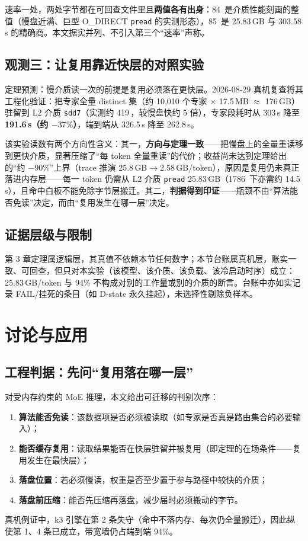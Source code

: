 \documentclass[11pt]{ctexart}
\begin{document}
速率一处，两处字节都在可回查文件里且\textbf{两值各有出身}：84\, 是介质性能刻画的整值（慢盘近满、巨型 O\_DIRECT \texttt{pread} 的实测形态），85\, 是 25.83\,GB 与 303.58\,s 的精确商。本文据实并列、不引入第三个“速率”声称。

\subsection{观测三：让复用靠近快层的对照实验}

定理预测：慢介质读一次的前提是复用必须落在更快层。2026-08-29 真机复查将其工程化验证：把专家全量 distinct 集（约 10,010 个专家 $\times$ 17.5\,MB $\approx$ 176\,GB）驻留到 L2 介质 \texttt{sdd7}（实测约 419\,，较慢盘快约 5 倍），专家段耗时从 303\,s 降至 \textbf{191.6\,s（约 $-37\%$）}，端到端从 326.5\,s 降至 262.8\,s。

该实验读数有两个方向性含义：其一，\textbf{方向与定理一致}——把慢盘上的全量重读移到更快介质，显著压缩了“每 token 全量重读”的代价；收益尚未达到定理给出的“约 $-90\%$”上界（trace 推演 25.8\,GB$\to$2.58\,GB/token），原因是复用仍未真正落进内存层——每一 token 仍需从 L2 介质 \texttt{pread} 25.83\,GB（1786\, 下亦需约 14.5\,s），且命中白板不能免除字节层搬迁。其二，\textbf{判据得到印证}——瓶颈不由“算法能否免读”决定，而由“复用发生在哪一层”决定。

\subsection{证据层级与限制}

第 3 章定理属逻辑层，其真值不依赖本节任何数字；本节台账属真机层，账实一致、可回查，但只对本实验（该模型、该介质、该负载、该冷启动时序）成立：25.83\,GB/token 与 94\% 不构成对别的工作量或别的介质的断言。台账中亦如实记录 FAIL/挂死的条目（如 D-state 永久挂起），未选择性剔除负样本。

\section{讨论与应用}

\subsection{工程判据：先问“复用落在哪一层”}

对受内存约束的 MoE 推理，本文给出可迁移的判别次序：
\begin{enumerate}
\item \textbf{算法能否免读}：该数据项是否必须被读取（如专家是否真是路由集合的必要输入）；
\item \textbf{能否缓存复用}：读取结果能否在快层驻留并被复用（即定理的在场条件——复用发生在最快层）；
\item \textbf{落盘位置}：若必须慢读，权重是否至少置于参与路径中较快的介质；
\item \textbf{落盘前压缩}：能否先压缩再落盘，减少届时必须搬动的字节。
\end{enumerate}
真机例证中，k3 引擎在第 2 条失守（命中不落内存、每次仍全量搬迁），因此纵使第 1、4 条已成立，带宽墙仍占端到端 94\%。
\end{document}
